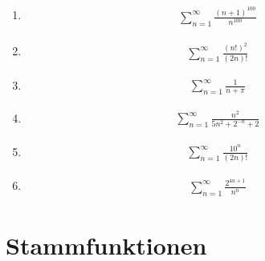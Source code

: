 \documentclass{article}
\begin{document}
\begin{multicols}{3}
\begin{enumerate}
    \item \begin{align*}
        \sum_{n = 1}^{\infty} \frac{(n + 1)^{100}}{n^{100}}
    \end{align*}

    \item \begin{align*}
        \sum_{n = 1}^{\infty} \frac{(n!)^2}{(2n)!}
    \end{align*}

    \item \begin{align*}
        \sum_{n = 1}^{\infty} \frac{1}{n + \pi}
    \end{align*}

    \item \begin{align*}
        \sum_{n = 1}^{\infty} \frac{n^2}{5n^2 + 2^{-n} + 2}
    \end{align*}

    \item \begin{align*}
        \sum_{n = 1}^{\infty} \frac{10^n}{(2n)!}
    \end{align*}

    \item \begin{align*}
        \sum_{n = 1}^{\infty} \frac{2^{4n + 1}}{n^n}
    \end{align*}
\end{enumerate}
\end{multicols}

\section*{Stammfunktionen}
\end{document}
